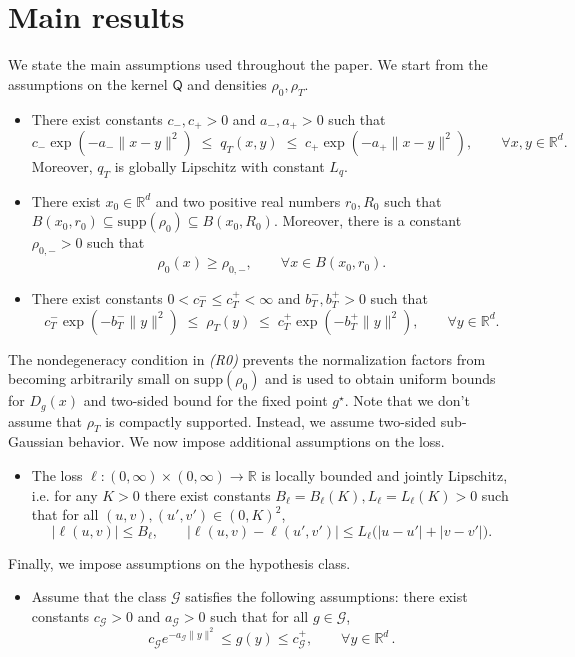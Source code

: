 \documentclass[11pt]{article}
\theoremstyle{remark}
\numberwithin{equation}{section}
\newcommand{\R}{\mathbb{R}}
\def\RefLaw{\mathsf{Q}}
\def\amin{a_{-}}
\def\amax{a_{+}}
\def\bmin{b_T^{-}}
\def\bmax{b_T^{+}}
\def\cmin{c_{-}}
\def\cmax{c_{+}}
\def\cTmin{c_T^{-}}
\def\cTmax{c_T^{+}}
\def\rhomin{\rho_{0,-}}
\def\aGmin{a_{\mathcal{G}}}
\def\cGmin{c_{\mathcal{G}}}
\def\cGmax{c_{\mathcal{G}}^{+}}
\begin{document}
\section{Main results}
We state the main assumptions used throughout the paper. We start from the assumptions on the kernel $\RefLaw$ and densities $\rho_0, \rho_T$. 
\begin{itemize}[noitemsep, nolistsep]
  \item[(Q)] 
   There exist constants $\cmin, \cmax>0$ and $\amin, \amax >0$ such that
  \[
    \cmin \exp(-\amin \|x-y\|^2)
    \;\le\;
    q_T(x,y)
    \;\le\;
    \cmax \exp(-\amax \|x-y\|^2),
    \qquad \forall x,y\in \R^d.
  \]
  Moreover, $q_T$ is globally Lipschitz with constant $L_q.$
  \item[(R0)] 
  There exist $x_0\in \R^d$ and two positive real numbers $r_0,R_0$   such that 
  $B(x_0,r_0)\subseteq\mathrm{supp}(\rho_0)\subseteq B(x_0,R_0).$
  Moreover, there is a constant $\rhomin >0$ such that
  \[
    \rho_0(x)\ge \rhomin, \qquad \forall x\in B(x_0,r_0).
  \]
  \item[(RT)] 
  There exist constants $0< \cTmin\le \cTmax<\infty$ and $\bmin, \bmax>0$ such that
  \[
    \cTmin \exp(-\bmin \|y\|^2)
    \;\le\;
    \rho_T(y)
    \;\le\;
    \cTmax \exp(-\bmax \|y\|^2),
    \qquad \forall y\in\mathbb{R}^d.
  \]
  \end{itemize}


The nondegeneracy condition in \emph{(R0)} prevents the normalization factors from becoming
arbitrarily small on $\mathrm{supp}(\rho_0)$ and is used to obtain uniform bounds for
$D_g(x)$ and two-sided bound for the fixed point $g^\star$. Note that we don't assume that $\rho_T$ is compactly supported. Instead, we assume two-sided sub-Gaussian behavior. We now impose additional assumptions on the loss.
\begin{itemize}[noitemsep, nolistsep]
  \item[(L)] The loss $\ell:(0,\infty)\times(0,\infty)\to\mathbb{R}$ is locally bounded
              and jointly Lipschitz, i.e. for any $K>0$ there exist constants $B_\ell=B_\ell(K),L_\ell=L_\ell(K)>0$
              such that for all $(u,v),(u',v')\in(0,K)^2$,
              \[
                |\ell(u,v)| \le B_\ell,
                \qquad
                |\ell(u,v)-\ell(u',v')|
                \le
                L_\ell\bigl(|u-u'| + |v-v'|\bigr).
              \]
\end{itemize}
Finally, we impose assumptions on the hypothesis class.
\begin{itemize}[noitemsep, nolistsep]
 \item[(G)] Assume  that the class
$\mathcal G$ satisfies the following assumptions:
there exist constants $\cGmin > 0$ and $\aGmin >0$ such that for all
$g\in\mathcal G$,
\begin{equation}\label{eq:G-gauss-control}
  \cGmin e^{-\aGmin \|y\|^2} \leq g(y) \leq \cGmax , 
  \qquad \forall y\in\mathbb{R}^d\, .
\end{equation}
\end{itemize}
\end{document}
